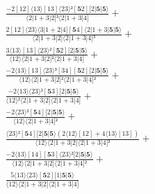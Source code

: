 \documentclass[varwidth, border=5pt]{standalone}
\begin{document}
\begin{my}
$\begin{gathered}
\scriptscriptstyle\frac{-2[12]⟨13⟩[13]⟨23⟩²[𝟓2][2|𝟓|𝟓⟩}{⟨2|1+3|2]³⟨2|1+3|4]} +\\
\scriptscriptstyle\frac{2[12]⟨23⟩⟨3|1+2|4][𝟓4]⟨2|1+3|𝟓|𝟓⟩}{⟨2|1+3|2]⟨2|1+3|4]³} +\\
\scriptscriptstyle\frac{3⟨13⟩[13]⟨23⟩²[𝟓2][2|𝟓|𝟓⟩}{⟨12⟩⟨2|1+3|2]²⟨2|1+3|4]} +\\
\scriptscriptstyle\frac{-2⟨13⟩[13]⟨23⟩³[34][𝟓2][2|𝟓|𝟓⟩}{⟨12⟩⟨2|1+3|2]²⟨2|1+3|4]²} +\\
\scriptscriptstyle\frac{-2⟨13⟩⟨23⟩²[𝟓3][2|𝟓|𝟓⟩}{⟨12⟩²⟨2|1+3|2]⟨2|1+3|4]} +\\
\scriptscriptstyle\frac{-2⟨23⟩²[𝟓4][2|𝟓|𝟓⟩}{⟨12⟩⟨2|1+3|4]²} +\\
\scriptscriptstyle\frac{⟨23⟩²[𝟓4][2|𝟓|𝟓⟩(2⟨12⟩[12]+4⟨13⟩[13])}{⟨12⟩⟨2|1+3|2]⟨2|1+3|4]²} +\\
\scriptscriptstyle\frac{-2⟨13⟩[14][𝟓3]⟨23⟩²[2|𝟓|𝟓⟩}{⟨12⟩⟨2|1+3|2]⟨2|1+3|4]²} +\\
\scriptscriptstyle\frac{5⟨13⟩⟨23⟩[𝟓2][1|𝟓|𝟓⟩}{⟨12⟩⟨2|1+3|2]⟨2|1+3|4]} \phantom{+}
\end{gathered}$
\end{my}
\end{document}
